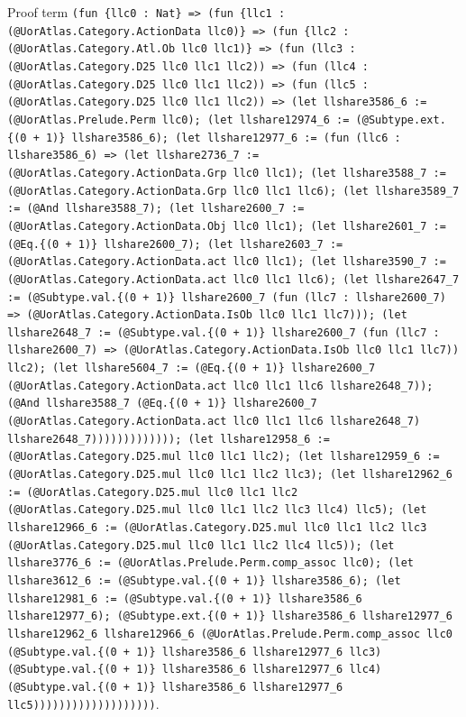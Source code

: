 \documentclass[11pt]{article}
\begin{document}
\noindent Proof term \texttt{(fun \{llc0 : Nat\} => (fun \{llc1 : (@UorAtlas.Category.ActionData llc0)\} => (fun \{llc2 : (@UorAtlas.Category.Atl.Ob llc0 llc1)\} => (fun (llc3 : (@UorAtlas.Category.D25 llc0 llc1 llc2)) => (fun (llc4 : (@UorAtlas.Category.D25 llc0 llc1 llc2)) => (fun (llc5 : (@UorAtlas.Category.D25 llc0 llc1 llc2)) => (let llshare3586\_6 := (@UorAtlas.Prelude.Perm llc0); (let llshare12974\_6 := (@Subtype.ext.\{(0 + 1)\} llshare3586\_6); (let llshare12977\_6 := (fun (llc6 : llshare3586\_6) => (let llshare2736\_7 := (@UorAtlas.Category.ActionData.Grp llc0 llc1); (let llshare3588\_7 := (@UorAtlas.Category.ActionData.Grp llc0 llc1 llc6); (let llshare3589\_7 := (@And llshare3588\_7); (let llshare2600\_7 := (@UorAtlas.Category.ActionData.Obj llc0 llc1); (let llshare2601\_7 := (@Eq.\{(0 + 1)\} llshare2600\_7); (let llshare2603\_7 := (@UorAtlas.Category.ActionData.act llc0 llc1); (let llshare3590\_7 := (@UorAtlas.Category.ActionData.act llc0 llc1 llc6); (let llshare2647\_7 := (@Subtype.val.\{(0 + 1)\} llshare2600\_7 (fun (llc7 : llshare2600\_7) => (@UorAtlas.Category.ActionData.IsOb llc0 llc1 llc7))); (let llshare2648\_7 := (@Subtype.val.\{(0 + 1)\} llshare2600\_7 (fun (llc7 : llshare2600\_7) => (@UorAtlas.Category.ActionData.IsOb llc0 llc1 llc7)) llc2); (let llshare5604\_7 := (@Eq.\{(0 + 1)\} llshare2600\_7 (@UorAtlas.Category.ActionData.act llc0 llc1 llc6 llshare2648\_7)); (@And llshare3588\_7 (@Eq.\{(0 + 1)\} llshare2600\_7 (@UorAtlas.Category.ActionData.act llc0 llc1 llc6 llshare2648\_7) llshare2648\_7))))))))))))); (let llshare12958\_6 := (@UorAtlas.Category.D25.mul llc0 llc1 llc2); (let llshare12959\_6 := (@UorAtlas.Category.D25.mul llc0 llc1 llc2 llc3); (let llshare12962\_6 := (@UorAtlas.Category.D25.mul llc0 llc1 llc2 (@UorAtlas.Category.D25.mul llc0 llc1 llc2 llc3 llc4) llc5); (let llshare12966\_6 := (@UorAtlas.Category.D25.mul llc0 llc1 llc2 llc3 (@UorAtlas.Category.D25.mul llc0 llc1 llc2 llc4 llc5)); (let llshare3776\_6 := (@UorAtlas.Prelude.Perm.comp\_assoc llc0); (let llshare3612\_6 := (@Subtype.val.\{(0 + 1)\} llshare3586\_6); (let llshare12981\_6 := (@Subtype.val.\{(0 + 1)\} llshare3586\_6 llshare12977\_6); (@Subtype.ext.\{(0 + 1)\} llshare3586\_6 llshare12977\_6 llshare12962\_6 llshare12966\_6 (@UorAtlas.Prelude.Perm.comp\_assoc llc0 (@Subtype.val.\{(0 + 1)\} llshare3586\_6 llshare12977\_6 llc3) (@Subtype.val.\{(0 + 1)\} llshare3586\_6 llshare12977\_6 llc4) (@Subtype.val.\{(0 + 1)\} llshare3586\_6 llshare12977\_6 llc5)))))))))))))))))))}.\par
\end{document}

